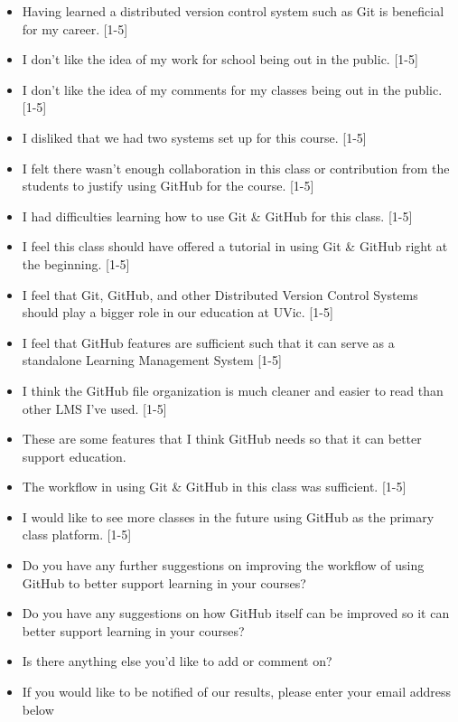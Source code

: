 \begin{itemize}
    \item Having learned a distributed version control system such as Git is beneficial for my career. [1-5]
    \item I don't like the idea of my work for school being out in the public. [1-5]
    \item I don't like the idea of my comments for my classes being out in the public. [1-5]
    \item I disliked that we had two systems set up for this course. [1-5]
    \item I felt there wasn't enough collaboration in this class or contribution from the students to justify using GitHub for the course. [1-5]
    \item I had difficulties learning how to use Git \& GitHub for this class. [1-5]
    \item I feel this class should have offered a tutorial in using Git \& GitHub right at the beginning. [1-5]
    \item I feel that Git, GitHub, and other Distributed Version Control Systems should play a bigger role in our education at UVic. [1-5]
    \item I feel that GitHub features are sufficient such that it can serve as a standalone Learning Management System [1-5]
    \item I think the GitHub file organization is much cleaner and easier to read than other LMS I've used. [1-5]
    \item These are some features that I think GitHub needs so that it can better support education.
    \item The workflow in using Git \& GitHub in this class was sufficient. [1-5]
    \item I would like to see more classes in the future using GitHub as the primary class platform. [1-5]
    \item Do you have any further suggestions on improving the workflow of using GitHub to better support learning in your courses?
    \item Do you have any suggestions on how GitHub itself can be improved so it can better support learning in your courses?
    \item Is there anything else you'd like to add or comment on?
    \item If you would like to be notified of our results, please enter your email address below
\end{itemize}
